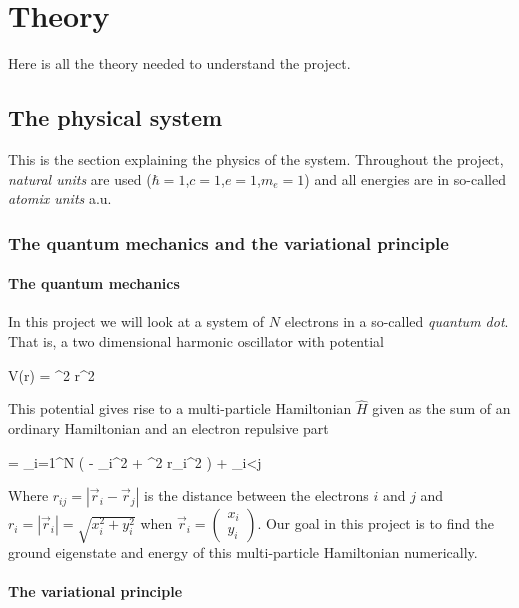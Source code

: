 \section{Theory}
Here is all the theory needed to understand the project.


\subsection{The physical system}
This is the section explaining the physics of the system. 
Throughout the project, \textit{natural units} are used ($\hbar = 1$,$c=1$,$e=1$,$m_e=1$) and all energies are in so-called \textit{atomix units} a.u. 

\subsubsection{The quantum mechanics and the variational principle} \label{sec:quantum_mechanics}

\paragraph{The quantum mechanics}

In this project we will look at a system of $N$ electrons in a so-called \textit{quantum dot}.
That is, a two dimensional harmonic oscillator with potential 

\eqs
V(\vec r) =  \omega^2 r^2
\label{eq:harmonic_oscillator_potential}
\eqf

This potential gives rise to a multi-particle Hamiltonian $\hat{H}$ given as the sum of an ordinary Hamiltonian and an electron repulsive part

\eqs
{} = \sum_{i=1}^N \left ( - \nabla_i^2 +  \omega^2 r_i^2 \right ) + \sum_{i<j}  
\label{eq:harmonic_oscillator_hamiltonian}
\eqf

Where $r_{ij} = |\vec r_i - \vec r_j| $ is the distance between the electrons $i$ and $j$ and $r_i = |\vec r_i | = \sqrt{x_i^2 + y_i^2}$ when $\vec r_i = \left ( \begin{matrix} x_i \\ y_i \end{matrix} \right ) $. 
Our goal in this project is to find the ground eigenstate and energy of this multi-particle Hamiltonian numerically. 

\paragraph{The variational principle}\label{sec:variational_principle}

